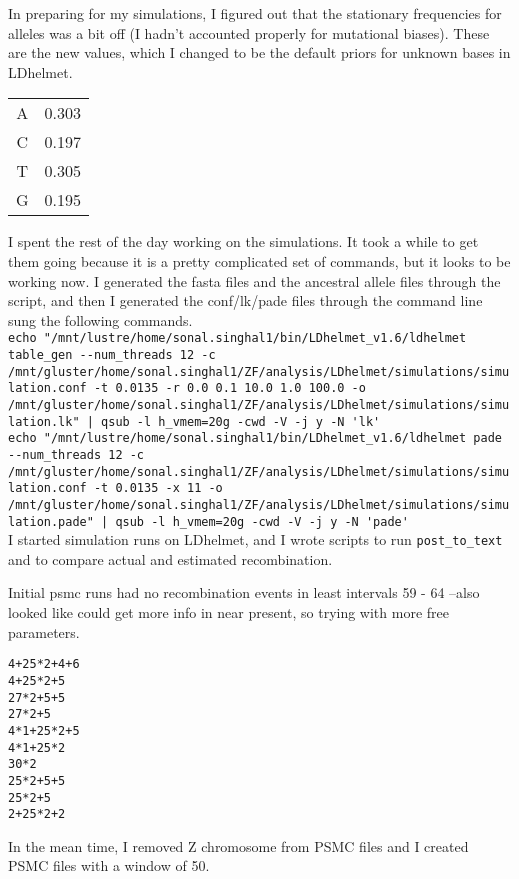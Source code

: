 \documentclass[idxtotoc,hyperref,openany,oneside]{labbook} %
\begin{document}
In preparing for my simulations, I figured out that the stationary frequencies for alleles was a bit off (I hadn't accounted properly for mutational biases). These are the new values, which I changed to be the default priors for unknown bases in LDhelmet.
\begin{tabular}{c c}
A & 0.303 \\
C & 0.197 \\
T & 0.305 \\
G & 0.195 \\
\end{tabular}

I spent the rest of the day working on the simulations. It took a while to get them going because it is a pretty complicated set of commands, but it looks to be working now. I generated the fasta files and the ancestral allele files through the script, and then I generated the conf/lk/pade files through the command line sung the following commands. \\
\verb+echo "/mnt/lustre/home/sonal.singhal1/bin/LDhelmet_v1.6/ldhelmet table_gen --num_threads 12 -c /mnt/gluster/home/sonal.singhal1/ZF/analysis/LDhelmet/simulations/simulation.conf -t 0.0135 -r 0.0 0.1 10.0 1.0 100.0 -o /mnt/gluster/home/sonal.singhal1/ZF/analysis/LDhelmet/simulations/simulation.lk" | qsub -l h_vmem=20g -cwd -V -j y -N 'lk'+ \\
\verb+echo "/mnt/lustre/home/sonal.singhal1/bin/LDhelmet_v1.6/ldhelmet pade --num_threads 12 -c /mnt/gluster/home/sonal.singhal1/ZF/analysis/LDhelmet/simulations/simulation.conf -t 0.0135 -x 11 -o /mnt/gluster/home/sonal.singhal1/ZF/analysis/LDhelmet/simulations/simulation.pade" | qsub -l h_vmem=20g -cwd -V -j y -N 'pade'+ \\

I started simulation runs on LDhelmet, and I wrote scripts to run \verb+post_to_text+ and to compare actual and estimated recombination.

Initial psmc runs had no recombination events in least intervals 59 - 64
--also looked like could get more info in near present, so trying with more free parameters.
\begin{verbatim}
4+25*2+4+6  
4+25*2+5 
27*2+5+5 
27*2+5 
4*1+25*2+5  
4*1+25*2 
30*2 
25*2+5+5  
25*2+5 
2+25*2+2 
\end{verbatim}

In the mean time, I removed Z chromosome from PSMC files and I created PSMC files with a window of 50. \\
\end{document}
